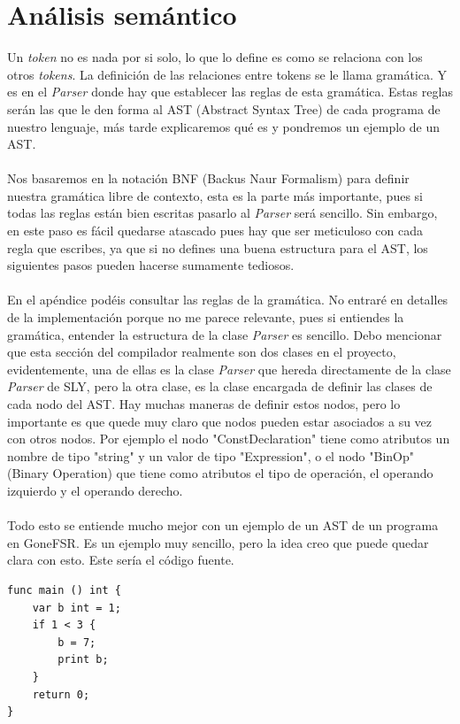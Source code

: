 \section{Análisis semántico}
Un \textit{token} no es nada por si solo, lo que lo define es como se relaciona con los otros \textit{tokens}. La definición de las relaciones entre tokens se le llama gramática. Y es en el \textit{Parser} donde hay que establecer las reglas de esta gramática. Estas reglas serán las que le den forma al AST (Abstract Syntax Tree) de cada programa de nuestro lenguaje, más tarde explicaremos qué es y pondremos un ejemplo de un AST.\\\\
Nos basaremos en la notación BNF (Backus Naur Formalism) para definir nuestra gramática libre de contexto, esta es la parte más importante, pues si todas las reglas están bien escritas pasarlo al \textit{Parser} será sencillo. Sin embargo, en este paso es fácil quedarse atascado pues hay que ser meticuloso con cada regla que escribes, ya que si no defines una buena estructura para el AST, los siguientes pasos pueden hacerse sumamente tediosos. \\\\
En el apéndice podéis consultar las reglas de la gramática. No entraré en detalles de la implementación porque no me parece relevante, pues si entiendes la gramática, entender la estructura de la clase \textit{Parser} es sencillo. Debo mencionar que esta sección del compilador realmente son dos clases en el proyecto, evidentemente, una de ellas es la clase \textit{Parser} que hereda directamente de la clase \textit{Parser} de SLY, pero la otra clase, es la clase encargada de definir las clases de cada nodo del AST. Hay muchas maneras de definir estos nodos, pero lo importante es que quede muy claro que nodos pueden estar asociados a su vez con otros nodos. Por ejemplo el nodo "ConstDeclaration" tiene como atributos un nombre de tipo "string" y un valor de tipo "Expression", o el nodo "BinOp" (Binary Operation) que tiene como atributos el tipo de operación, el operando izquierdo y el operando derecho.\\\\ 
Todo esto se entiende mucho mejor con un ejemplo de un AST de un programa en GoneFSR. Es un ejemplo muy sencillo, pero la idea creo que puede quedar clara con esto. Este sería el código fuente.

\begin{lstlisting}[style=goneStyle]
func main () int {
    var b int = 1;
    if 1 < 3 {
        b = 7;
        print b;
    }
    return 0;
}
\end{lstlisting}



